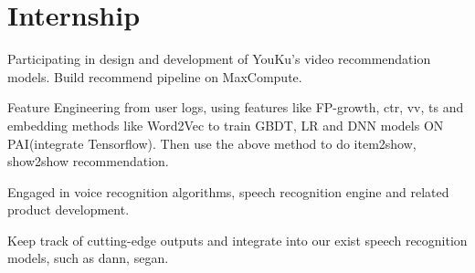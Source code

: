 \documentclass[]{deedy-resume-openfont}
\begin{document}
\begin{minipage}[t]{0.69\textwidth} 


\section{Internship}

\vspace{\topsep} %
\begin{tightemize}
\item Participating in design and development of YouKu's video recommendation models. Build recommend pipeline on MaxCompute.
\item Feature Engineering from user logs, using features like FP-growth, ctr, vv, ts and embedding methods like Word2Vec to train GBDT, LR and DNN models ON PAI(integrate Tensorflow). Then use the above method to do item2show, show2show recommendation.
\vspace{\topsep}
\end{tightemize}

\vspace{\topsep} %
\begin{tightemize}
\item Engaged in voice recognition algorithms, speech recognition engine and related product development. 
\item Keep track of cutting-edge outputs and integrate into our exist speech recognition models, such as dann, segan.
\vspace{\topsep}
\end{tightemize}




\end{minipage}
\end{document}
